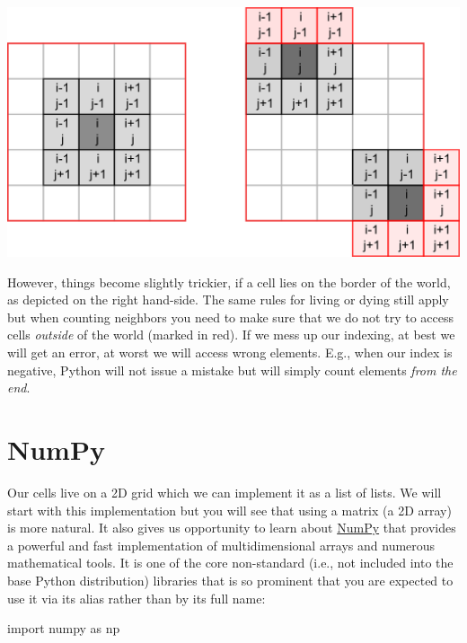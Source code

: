 \documentclass[
]{book}
\newenvironment{Shaded}{\begin{snugshade}}{\end{snugshade}}
\newcommand{\ImportTok}[1]{#1}
\newcommand{\NormalTok}[1]{#1}
\begin{document}
\begin{center}\includegraphics[width=1\linewidth]{images/game-of-life-grid} \end{center}

However, things become slightly trickier, if a cell lies on the border of the world, as depicted on the right hand-side. The same rules for living or dying still apply but when counting neighbors you need to make sure that we do not try to access cells \emph{outside} of the world (marked in red). If we mess up our indexing, at best we will get an error, at worst we will access wrong elements. E.g., when our index is negative, Python will not issue a mistake but will simply count elements \emph{from the end}.

\hypertarget{numpy}{%
\section{NumPy}\label{numpy}}

Our cells live on a 2D grid which we can implement it as a list of lists. We will start with this implementation but you will see that using a matrix (a 2D array) is more natural. It also gives us opportunity to learn about \href{https://numpy.org/}{NumPy} that provides a powerful and fast implementation of multidimensional arrays and numerous mathematical tools. It is one of the core non-standard (i.e., not included into the base Python distribution) libraries that is so prominent that you are expected to use it via its alias rather than by its full name:

\begin{Shaded}
\begin{Highlighting}[]
\ImportTok{import}\NormalTok{ numpy }\ImportTok{as}\NormalTok{ np}
\end{Highlighting}
\end{Shaded}
\end{document}
